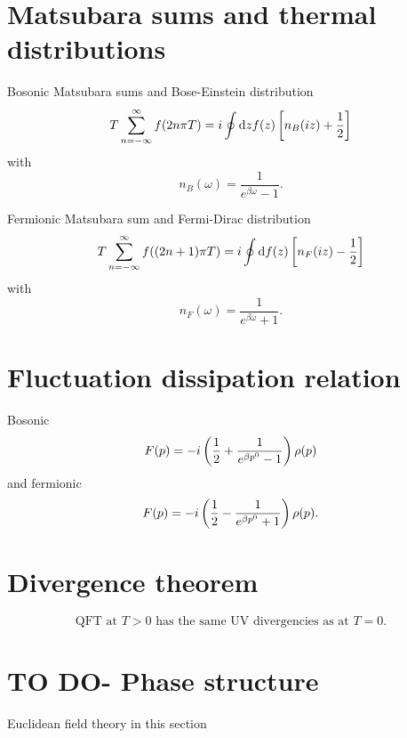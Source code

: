 \section{Matsubara sums and thermal distributions}
\begin{mybox}{Bosonic Matsubara sums and Bose-Einstein distribution}
	\begin{equation}
	T \sum_{n=-\infty}^\infty  f(2 n \pi T) = i \oint \mathrm{d} z f(z) \left[n_B(iz) + \frac{1}{2} \right] 
	\end{equation}
	with 
	\begin{equation}
		n_B(\omega) = \frac{1}{e^{\beta \omega} -1}.
	\end{equation}
\end{mybox}
\begin{mybox}{Fermionic Matsubara sum and Fermi-Dirac distribution}
	\begin{equation}
		T \sum_{n=-\infty}^\infty f((2n+1) \pi T) = i \oint \mathrm{d} f(z) \left[n_F(iz) - \frac{1}{2} \right]
	\end{equation}
	with 
	\begin{equation}
		n_F(\omega) = \frac{1}{e^{\beta \omega} +1}.
	\end{equation}
\end{mybox}

\section{Fluctuation dissipation relation}
\begin{mybox}{}
	Bosonic
	\begin{equation}
		F(p) = -i \left(\frac{1}{2} + \frac{1}{e^{\beta p^0} -1}\right) \rho(p) 
	\end{equation}
	and fermionic
	\begin{equation}
		F(p) = -i \left(\frac{1}{2} - \frac{1}{e^{\beta p^0} +1}\right)\rho(p).
	\end{equation}
\end{mybox}
\section{Divergence theorem}
\begin{mybox}{}
	\begin{equation}
	\text{QFT at } T>0 \text{ has the same UV divergencies as at } T=0.
	\end{equation}
\end{mybox}
\section{TO DO- Phase structure}
Euclidean field theory in this section
